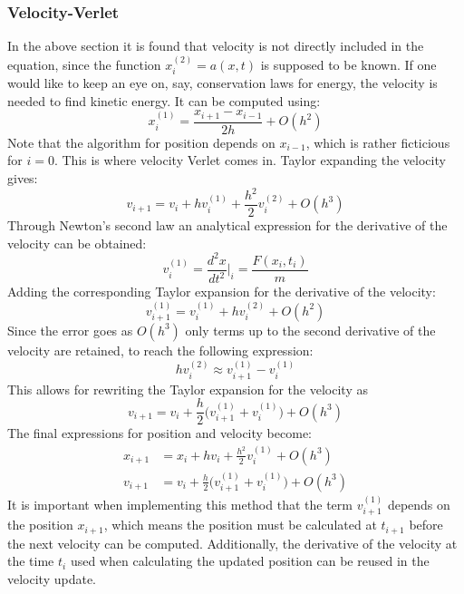 \subsubsection{Velocity-Verlet}
In the above section it is found that velocity is not directly included in the equation, since
the function $x_i^{{(2)}} = a(x,t)$ is supposed to be known. If one would like to keep an eye on, say,
conservation laws for energy, the velocity is needed to find kinetic energy. It can be computed
using:
\begin{equation*}
x_i^{(1)} = \frac{x_{i+1} - x_{i-1}}{2h} + O(h^2)
\end{equation*}
Note that the algorithm for position depends on $x_{i-1}$, which is rather ficticious for $i=0$.
This is where velocity Verlet comes in.  
\newline 
Taylor expanding the velocity gives:
\begin{equation*}
v_{i+1} = v_i + hv_i^{(1)} + \frac{h^2}{2}v_i^{{(2)}} + O(h^3)
\end{equation*}
Through Newton's second law an analytical expression for the derivative of the velocity can be
obtained:
\begin{equation*}
v_i^{(1)} = \frac{d^2x}{dt^2}|_i =\frac{F(x_i,t_i)}{m}
\end{equation*}
Adding the corresponding Taylor expansion for the derivative of the velocity:
\begin{equation*}
v_{i+1}^{(1)} = v_i^{(1)} + hv_i^{{(2)}} + O(h^2)
\end{equation*}
Since the error goes as $O(h^3)$ only terms up to the second derivative of the velocity are retained,
to reach the following expression:
\begin{equation*}
hv_i^{{(2)}} \approx v_{i+1}^{(1)} - v_i^{(1)}
\end{equation*}
This allows for rewriting the Taylor expansion for the velocity as
\begin{equation*}
v_{i+1} = v_i + \frac{h}{2}\big(v_{i+1}^{(1)} + v_i^{(1)}\big) + O(h^3)
\end{equation*}
The final expressions for position and velocity become:
\begin{align*}
x_{i+1} &= x_i + hv_i + \frac{h^2}{2}v_i^{(1)} + O(h^3) \\
v_{i+1} &= v_i + \frac{h}{2}\big(v_{i+1}^{(1)} + v_i^{(1)}\big) + O(h^3)
\end{align*}
It is important when implementing this method that the term $v_{i+1}^{(1)}$ depends on the position
$x_{i+1}$, which means the position must be calculated at $t_{i+1}$ before the next velocity can
be computed. Additionally, the derivative of the velocity at the time $t_i$ used when calculating
the updated position can be reused in the velocity update.


